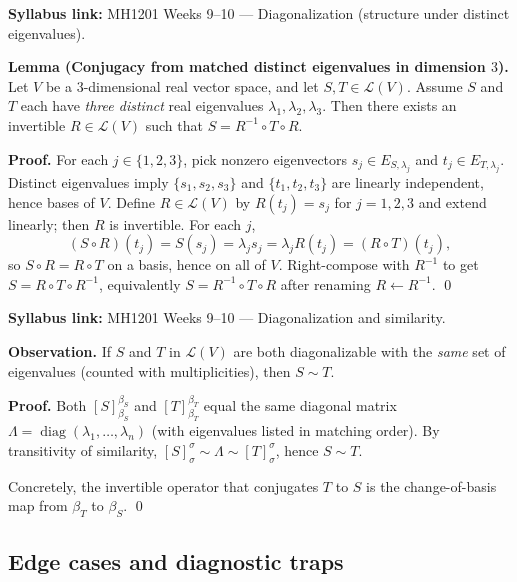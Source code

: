 \begin{extension}[title={Extension (Tutorial 8, Question 4, Method 1)}]
\textbf{Syllabus link:} MH1201 Weeks 9--10 --- Diagonalization (structure under distinct eigenvalues).

\textbf{Lemma (Conjugacy from matched distinct eigenvalues in dimension $3$).}
Let $V$ be a $3$-dimensional real vector space, and let $S,T\in\mathcal{L}(V)$.
Assume $S$ and $T$ each have \emph{three distinct} real eigenvalues $\lambda_1,\lambda_2,\lambda_3$.
Then there exists an invertible $R\in\mathcal{L}(V)$ such that $S=R^{-1}\circ T\circ R$.

\textbf{Proof.}
For each $j\in\{1,2,3\}$, pick nonzero eigenvectors $s_j\in E_{S,\lambda_j}$ and $t_j\in E_{T,\lambda_j}$.
Distinct eigenvalues imply $\{s_1,s_2,s_3\}$ and $\{t_1,t_2,t_3\}$ are linearly independent, hence bases of $V$.
Define $R\in\mathcal{L}(V)$ by $R(t_j)=s_j$ for $j=1,2,3$ and extend linearly; then $R$ is invertible.
For each $j$,
\[
(S\circ R)(t_j)=S(s_j)=\lambda_j s_j=\lambda_j R(t_j)=(R\circ T)(t_j),
\]
so $S\circ R=R\circ T$ on a basis, hence on all of $V$. Right-compose with $R^{-1}$ to get $S=R\circ T\circ R^{-1}$,
equivalently $S=R^{-1}\circ T\circ R$ after renaming $R\leftarrow R^{-1}$. \qed
\end{extension}

\begin{extension}[title={Extension (Tutorial 8, Question 4, Method 2): conjugacy via shared diagonal form}]
\textbf{Syllabus link:} MH1201 Weeks 9--10 --- Diagonalization and similarity.

\textbf{Observation.} If $S$ and $T$ in $\mathcal{L}(V)$ are both diagonalizable with the \emph{same} set of eigenvalues (counted with multiplicities), then $S\sim T$.

\textbf{Proof.} Both $[S]_{\beta_S}^{\beta_S}$ and $[T]_{\beta_T}^{\beta_T}$ equal the same diagonal matrix $\Lambda=\operatorname{diag}(\lambda_1,\dots,\lambda_n)$ (with eigenvalues listed in matching order).
By transitivity of similarity, $[S]_\sigma^\sigma \sim \Lambda \sim [T]_\sigma^\sigma$, hence $S\sim T$.

Concretely, the invertible operator that conjugates $T$ to $S$ is the change-of-basis map from $\beta_T$ to $\beta_S$. \qed
\end{extension}

\subsection{Edge cases and diagnostic traps}

